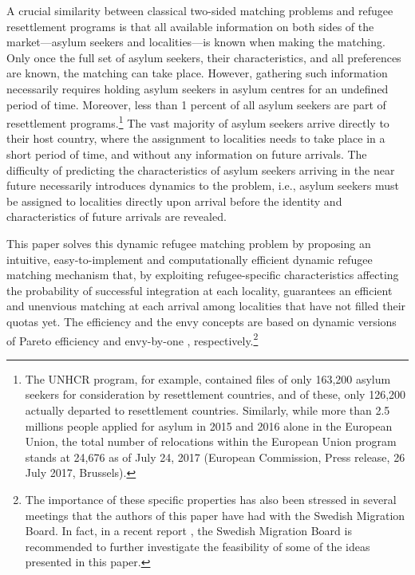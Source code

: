 \documentclass[12pt,fleqn]{article}
\begin{document}
A crucial similarity between classical two-sided matching problems and refugee resettlement programs is that all available information on both sides of the market---asylum seekers and localities---is known when making the matching. Only once the full set of asylum seekers, their characteristics, and all preferences are known, the matching can take place. However, gathering such information necessarily requires holding asylum seekers in asylum centres for an undefined period of time. Moreover, less than 1 percent of all asylum seekers are part of resettlement programs.\footnote{The UNHCR program, for example, contained files of only 163,200 asylum seekers for consideration by resettlement countries, and of these, only 126,200 actually departed to resettlement countries. Similarly, while more than 2.5 millions people applied for asylum in 2015 and 2016 alone in the European Union, the total number of relocations within the European Union program stands at 24,676 as of July 24, 2017 (European Commission, Press release, 26 July 2017, Brussels).} The vast majority of asylum seekers arrive directly to their host country, where the assignment to localities needs to take place in a short period of time, and without any information on future arrivals. The difficulty of predicting the characteristics of asylum seekers arriving in the near future necessarily introduces dynamics to the problem, i.e., asylum seekers must be assigned to localities directly upon arrival before the identity and characteristics of future arrivals are revealed.

This paper solves this dynamic refugee matching problem by proposing an intuitive, easy-to-implement and computationally efficient dynamic refugee matching mechanism that, by exploiting refugee-specific characteristics affecting the probability of successful integration at each locality, guarantees an efficient and unenvious matching at each arrival among localities that have not filled their quotas yet. The efficiency and the envy concepts are based on dynamic versions of Pareto efficiency and envy-by-one \citep{bib:Budish}, respectively.\footnote{The importance of these specific properties has also been stressed in several meetings that the authors of this paper have had with the Swedish Migration Board. In fact, in a recent report \citep[Swedish Government,][]{SOU2018}, the Swedish Migration Board is recommended to further investigate the feasibility of some of the ideas presented in this paper.} 
\end{document}
